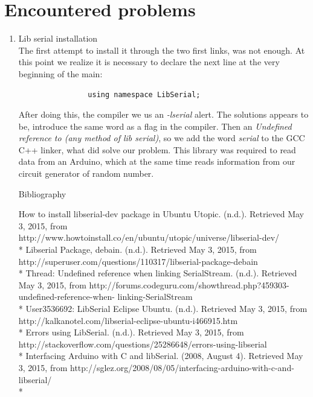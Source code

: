\documentclass[twocolumn]{IEEEtran}
\begin{document}
\cite{LaTeXTemplates}

\section{Encountered problems}
\begin{enumerate}
	\item Lib serial installation\\
    The first attempt to install it through the two first links, was not enough. At this 
    point we realize it is necessary to declare the next line at the very beginning of 
    the main:
    \begin{center}
 	   \begin{verbatim}
			    using namespace LibSerial;
		\end{verbatim}

	\end{center}
 	After doing this, the compiler we us an \textit{-lserial} alert. The solutions 
    appears to be, introduce the same word as a flag in the compiler. Then an \textit{ 
    Undefined reference to (any method of lib serial)}, so we add the word 
    \textit{serial} to the GCC C++ linker, what did solve our problem. This library was 
    required to read data from an Arduino, which at the same time reads information from 
    our circuit generator of random number.\\

	\begin{center}
    Bibliography
    \end{center}
	How to install libserial-dev package in Ubuntu Utopic. (n.d.). Retrieved May 3, 
    2015, from http://www.howtoinstall.co/en/ubuntu/utopic/universe/libserial-dev/ \\*
    Libserial Package, debain. (n.d.). Retrieved May 3, 2015, from
    http://superuser.com/questions/110317/libserial-package-debain  \\*
    Thread: Undefined reference when linking SerialStream. (n.d.). Retrieved May 3, 
    2015, from http://forums.codeguru.com/showthread.php?459303-undefined-reference-when-
    linking-SerialStream \\*
    User3536692: LibSerial Eclipse Ubuntu. (n.d.). Retrieved May 3, 2015, from 
    http://kalkanotel.com/libserial-eclipse-ubuntu-i466915.htm \\*
    Errors using LibSerial. (n.d.). Retrieved May 3, 2015, from 
    http://stackoverflow.com/questions/25286648/errors-using-libserial \\*
    Interfacing Arduino with C and libSerial. (2008, August 4). Retrieved May 3, 
    2015, from http://sglez.org/2008/08/05/interfacing-arduino-with-c-and-libserial/ \\*
    

\end{enumerate}
\end{document}
